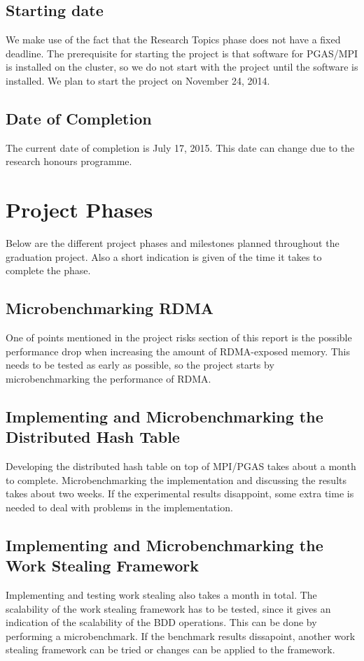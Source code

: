 \subsection{Starting date}
We make use of the fact that the Research Topics phase does not have a fixed deadline. The prerequisite for starting the project is that software for PGAS/MPI is installed on the cluster, so we do not start with the project until the software is installed. We plan to start the project on November 24, 2014.

\subsection{Date of Completion}
The current date of completion is July 17, 2015. This date can change due to the research honours programme. 

\section{Project Phases}
Below are the different project phases and milestones planned throughout the graduation project. Also a short indication is given of the time it takes to complete the phase.

\subsection{Microbenchmarking RDMA}
One of points mentioned in the project risks section of this report is the possible performance drop when increasing the amount of RDMA-exposed memory. This needs to be tested as early as possible, so the project starts by microbenchmarking the performance of RDMA.  

\subsection{Implementing and Microbenchmarking the Distributed Hash Table}
Developing the distributed hash table on top of MPI/PGAS takes about a month to complete. Microbenchmarking the implementation and discussing the results takes about two weeks. If the experimental results disappoint, some extra time is needed to deal with problems in the implementation.

\subsection{Implementing and Microbenchmarking the Work Stealing Framework}
Implementing and testing work stealing also takes a month in total. The scalability of the work stealing framework has to be tested, since it gives an indication of the scalability of the BDD operations. This can be done by performing a microbenchmark. If the benchmark results dissapoint, another work stealing framework can be tried or changes can be applied to the framework.

